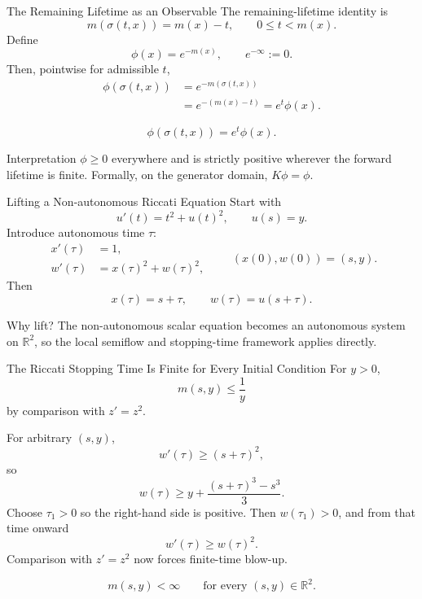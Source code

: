 \documentclass[aspectratio=169,11pt]{beamer}
\newcommand{\R}{\mathbb{R}}
\newcommand{\mstop}{m}
\newcommand{\flow}{\sigma}
\begin{document}
\begin{frame}{The Remaining Lifetime as an Observable}
\small
The remaining-lifetime identity is
\[
\mstop(\flow(t,x))=\mstop(x)-t,
\qquad 0\le t<\mstop(x).
\]
Define
\[
\boxed{\phi(x)=e^{-\mstop(x)}},
\qquad e^{-\infty}:=0.
\]
Then, pointwise for admissible \(t\),
\[
\begin{aligned}
\phi(\flow(t,x))
&=e^{-\mstop(\flow(t,x))}\\
&=e^{-(\mstop(x)-t)}
=e^t\phi(x).
\end{aligned}
\]

\[
\boxed{\phi(\flow(t,x))=e^t\phi(x).}
\]

\begin{alertblock}{Interpretation}
\(\phi\ge0\) everywhere and is strictly positive wherever the forward lifetime is finite. Formally, on the generator domain, \(K\phi=\phi\).
\end{alertblock}
\end{frame}

\begin{frame}{Lifting a Non-autonomous Riccati Equation}
\small
Start with
\[
u'(t)=t^2+u(t)^2,
\qquad
u(s)=y.
\]
Introduce autonomous time \(\tau\):
\[
\boxed{
\begin{aligned}
x'(\tau)&=1,\\
w'(\tau)&=x(\tau)^2+w(\tau)^2,
\end{aligned}}
\qquad
(x(0),w(0))=(s,y).
\]
Then
\[
x(\tau)=s+\tau,
\qquad
w(\tau)=u(s+\tau).
\]

\begin{alertblock}{Why lift?}
The non-autonomous scalar equation becomes an autonomous system on \(\R^2\), so the local semiflow and stopping-time framework applies directly.
\end{alertblock}
\end{frame}

\begin{frame}{The Riccati Stopping Time Is Finite for Every Initial Condition}
\footnotesize
For \(y>0\),
\[
\boxed{\mstop(s,y)\le\frac1y}
\]
by comparison with \(z'=z^2\).

For arbitrary \((s,y)\),
\[
w'(\tau)\ge(s+\tau)^2,
\]
so
\[
w(\tau)
\ge
y+\frac{(s+\tau)^3-s^3}{3}.
\]
Choose \(\tau_1>0\) so the right-hand side is positive. Then \(w(\tau_1)>0\), and from that time onward
\[
w'(\tau)\ge w(\tau)^2.
\]
Comparison with \(z'=z^2\) now forces finite-time blow-up.

\[
\boxed{\mstop(s,y)<\infty
\qquad\text{for every }(s,y)\in\R^2.}
\]
\end{frame}
\end{document}
